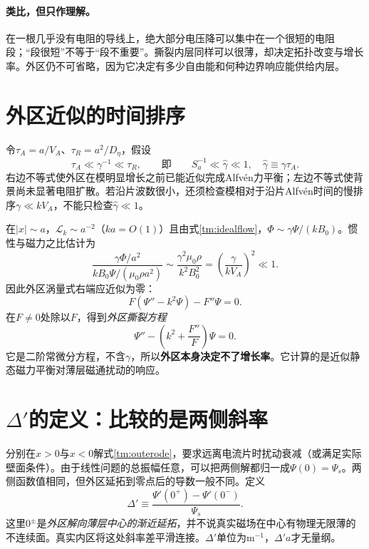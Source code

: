 \paragraph{类比，但只作理解。}
在一根几乎没有电阻的导线上，绝大部分电压降可以集中在一个很短的电阻段；“段很短”不等于“段不重要”。撕裂内层同样可以很薄，却决定拓扑改变与增长率。外区仍不可省略，因为它决定有多少自由能和何种边界响应能供给内层。

\section{外区近似的时间排序}
令$\tau_A=a/V_A$、$\tau_R=a^2/D_\eta$，假设
\begin{equation}
 \tau_A\ll\gamma^{-1}\ll\tau_R,
 \qquad\text{即}\qquad S_a^{-1}\ll\hat\gamma\ll1,
 \quad \hat\gamma\equiv\gamma\tau_A.
 \label{tm:outerordering}
\end{equation}
右边不等式使外区在模明显增长之前已能近似完成Alfv\'en力平衡；左边不等式使背景尚未显著电阻扩散。若沿片波数很小，还须检查模相对于沿片Alfv\'en时间的慢排序$\gamma\ll kV_A$，不能只检查$\hat\gamma\ll1$。

在$|x|\sim a$，$\mathcal L_k\sim a^{-2}$（$ka=O(1)$）且由式\eqref{tm:idealflow}，$\Phi\sim\gamma\Psi/(kB_0)$。惯性与磁力之比估计为
\begin{equation}
 \frac{\gamma\Phi/a^2}{kB_0\Psi/(\mu_0\rho a^2)}
 \sim\frac{\gamma^2\mu_0\rho}{k^2B_0^2}
 =\left(\frac{\gamma}{kV_A}\right)^2\ll1.
\end{equation}
因此外区涡量式右端应近似为零：
\begin{equation}
 F(\Psi''-k^2\Psi)-F''\Psi=0.
\end{equation}
在$F\ne0$处除以$F$，得到\emph{外区撕裂方程}
\begin{equation}
 \boxed{\Psi''-\left(k^2+\frac{F''}{F}\right)\Psi=0.}
 \label{tm:outerode}
\end{equation}
它是二阶常微分方程，不含$\gamma$，所以\textbf{外区本身决定不了增长率}。它计算的是近似静态磁力平衡对薄层磁通扰动的响应。\citep{TMFitzMatching}

\section{\texorpdfstring{$\Delta'$}{Delta prime}的定义：比较的是两侧斜率}
分别在$x>0$与$x<0$解式\eqref{tm:outerode}，要求远离电流片时扰动衰减（或满足实际壁面条件）。由于线性问题的总振幅任意，可以把两侧解都归一成$\Psi(0)=\Psi_s$。两侧函数值相同，但外区延拓到零点后的导数一般不同。定义
\begin{equation}
 \boxed{\Delta'\equiv
 \frac{\Psi'(0^+)-\Psi'(0^-)}{\Psi_s}.}
 \label{tm:deltaprime}
\end{equation}
这里$0^\pm$是\emph{外区解向薄层中心的渐近延拓}，并不说真实磁场在中心有物理无限薄的不连续面。真实内区将这处斜率差平滑连接。$\Delta'$单位为$\mathrm{m^{-1}}$，$\Delta'a$才无量纲。

